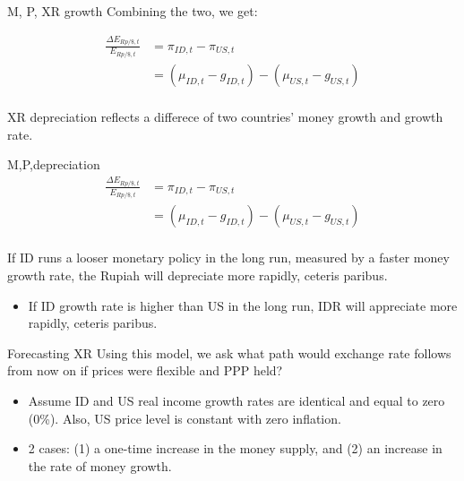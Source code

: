 \documentclass[
  ignorenonframetext,
]{beamer}
\providecommand{\tightlist}{%
  \setlength{\itemsep}{0pt}\setlength{\parskip}{0pt}}\usepackage{longtable,booktabs,array}
\begin{document}
\begin{frame}{M, P, XR growth}
\label{m-p-xr-growth-2}
Combining the two, we get:

\begin{align*}
\frac{\Delta E_{Rp/\$,t}}{E_{Rp/\$,t}}&=\pi_{ID,t}-\pi_{US,t} \\
&= (\mu_{ID,t}-g_{ID,t})-(\mu_{US,t}-g_{US,t}) \\
\end{align*}

XR depreciation reflects a differece of two countries' money growth and
growth rate.
\end{frame}

\begin{frame}{M,P,depreciation}
\label{mpdepreciation}
\begin{align*}
\frac{\Delta E_{Rp/\$,t}}{E_{Rp/\$,t}}&=\pi_{ID,t}-\pi_{US,t} \\
&= (\mu_{ID,t}-g_{ID,t})-(\mu_{US,t}-g_{US,t}) \\
\end{align*}

If ID runs a looser monetary policy in the long run, measured by a
faster money growth rate, the Rupiah will depreciate more rapidly,
ceteris paribus.

\begin{itemize}
\tightlist
\item
  If ID growth rate is higher than US in the long run, IDR will
  appreciate more rapidly, ceteris paribus.
\end{itemize}
\end{frame}

\begin{frame}{Forecasting XR}
\label{forecasting-xr}
Using this model, we ask what path would exchange rate follows from now
on if prices were flexible and PPP held?

\begin{itemize}
\item
  Assume ID and US real income growth rates are identical and equal to
  zero (0\%). Also, US price level is constant with zero inflation.
\item
  2 cases: (1) a one-time increase in the money supply, and (2) an
  increase in the rate of money growth.
\end{itemize}
\end{frame}
\end{document}
